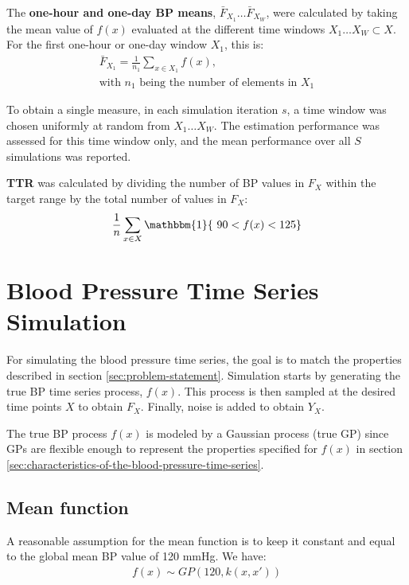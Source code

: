The \textbf{one-hour and one-day BP means}, $\bar{F}_{X_1} \dots \bar{F}_{X_W}$,
were calculated by taking the mean value of $f(x)$ evaluated at the different
time windows $X_1 \dots X_W \subset X$.
For the first one-hour or one-day window $X_1$, this is:
\begin{gather*}
    \bar{F}_{X_1} = \frac{1}{n_1} \sum_{x \in X_1} f(x), \\
    \text{with $n_1$ being the number of elements in $X_1$}
\end{gather*}

To obtain a single measure,
in each simulation iteration $s$, a time window
was chosen uniformly at random from $X_1 \dots X_W$.
The estimation performance was assessed for this time window only, and
the mean performance over all $S$ simulations was reported.

\textbf{TTR} was calculated by dividing the number of BP values in $F_X$
within the target range by the total number of values in $F_X$:
\begin{gather*}
    \frac{1}{n} \sum_{x \in X} \mathbbm{1}\{\ 90 < f(x) < 125 \}
\end{gather*}


\section{Blood Pressure Time Series Simulation}\label{sec:blood-pressure-time-series-simulation}

For simulating the blood pressure time series, the goal is to match the
properties described in section \ref{sec:problem-statement}. Simulation starts by
generating the true BP time series process, $f(x)$. This process is then sampled
at the desired time points $X$ to obtain $F_X$. Finally, noise is added to obtain
$Y_X$.

The true BP process $f(x)$ is modeled by a Gaussian process (true GP)
since GPs are flexible enough to represent the properties
specified for $f(x)$ in section \ref{sec:characteristics-of-the-blood-pressure-time-series}.

\subsection{Mean function}
A reasonable assumption for the mean function is to keep it constant and
equal to the global mean BP value of 120 mmHg. We have:
\begin{gather*}
    f(x) \sim GP(120, k(x,x'))
\end{gather*}

